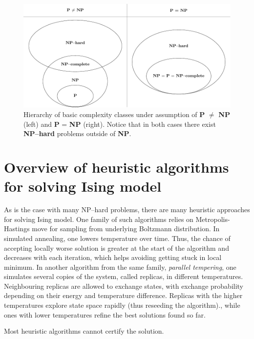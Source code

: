 \begin{figure}
    \includegraphics[width=\textwidth]{figures/complexity_new.pdf}
    \caption{Hierarchy of basic complexity classes under assumption of \textbf{P} $\ne$ \textbf{NP} (left) and \textbf{P} = \textbf{NP} (right). Notice that in both cases there exist \textbf{NP--hard} problems outside of \textbf{NP}.}
    \label{fig:complexity}
\end{figure}



\section{Overview of heuristic algorithms for solving Ising model}

As is the case with many NP--hard problems, there are many heuristic approaches for solving Ising model. One family of such algorithms relies on Metropolis-Hastings move for sampling from underlying Boltzmann distribution. In simulated annealing, one lowers temperature over time. Thus, the chance of accepting locally worse solution is greater at the start of the algorithm and decreases with each iteration, which helps avoiding getting stuck in local minimum. In another algorithm from the same family, \emph{parallel tempering}, one simulates several copies of the system, called replicas, in different temperatures. Neighbouring replicas are allowed to exchange states, with exchange probability depending on their energy and temperature difference. Replicas with the higher temperatures explore state space rapidly (thus reseeding the algorithm)., while ones with lower temperatures refine the best solutions found so far.

Most heuristic algorithms cannot certify the solution. 

